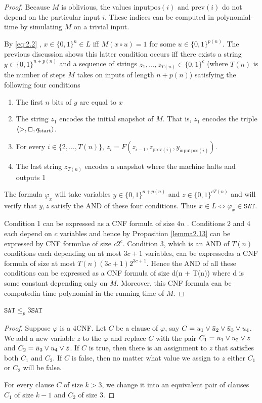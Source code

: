 \documentclass[11pt]{article}
\def \SAT {\text{SAT}}
\def \start {\text{start}}
\def \SAT {\texttt{SAT}}
\begin{document}
\begin{proof}
Because \(M\) is oblivious, the values \(\text{inputpos}(i)\) and \(\text{prev}(i)\) do not
depend on the particular input \(i\). These indices can be computed in polynomial-time by
simulating \(M\) on a trivial input.

By \eqref{eq:2.2} , \(x\in\{0,1\}^{n}\in L\) iff \(M(x\circ u)=1\) for
some \(u\in\{0,1\}^{p(n)}\). The previous discussion shows this latter condition occurs iff
there exists a string \(y\in\{0,1\}^{n+p(n)}\) and a sequence of strings
\(z_1,\dots,z_{T(n)}\in\{0,1\}^c\) (where \(T(n)\) is the number of steps \(M\) takes on inputs
of length \(n+p(n)\)) satisfying the following four conditions
\begin{enumerate}
\item The first \(n\) bits of \(y\) are equal to \(x\)
\item The string \(z_1\) encodes the initial snapshot of \(M\). That is, \(z_1\) encodes the
triple \(\la\rhd,\Box,q_{\start}\ra\).
\item For every \(i\in\{2,\dots,T(n)\}\), \(z_i=F(z_{i-1},z_{\text{prev}(i)},y_{\text{inputpos}(i)})\).
\item The last string \(z_{T(n)}\) encodes a snapshot where the machine halts and outputs 1
\end{enumerate}


The formula \(\varphi_x\) will take variables \(y\in\{0,1\}^{n+p(n)}\)
and \(z\in\{0,1\}^{cT(n)}\) and will verify that \(y,z\) satisfy the AND of these four
conditions. Thus \(x\in L\Leftrightarrow\varphi_x\in\SAT\).

Condition 1 can be expressed as a CNF formula of size \(4n\) . Conditions 2 and 4 each depend
on \(c\) variables and hence by Proposition \ref{lemma2.13} can be expressed by CNF formulae of
size \(c2^c\). Condition 3, which is an AND of \(T(n)\) conditions each  depending on at most \(3c+1\)
variables, can be expressedas a CNF formula of size at most \(T(n)(3c+1)2^{3c+1}\). Hence the AND of all
these conditions can be expressed as a CNF formula of size d(n + T(n)) where d is some constant
depending only on \(M\). Moreover, this CNF formula can be computedin time polynomial in the running
time of \(M\).
\end{proof}

\begin{lemma}[]
\(\SAT\le_p3\SAT\)
\end{lemma}

\begin{proof}
Suppose \(\varphi\) is a 4CNF. Let \(C\) be a clause of \(\varphi\), say \(C=u_1\vee\bar{u}_2\vee\bar{u}_3\vee u_4\).
We add a new variable \(z\) to the \(\varphi\) and replace \(C\) with the pair
\(C_1=u_1\vee\bar{u}_2\vee z\) and \(C_2=\bar{u}_3\vee u_4\vee\bar{z}\). If \(C\) is true, then there
is an assignment to \(z\) that satisfies both \(C_1\) and \(C_2\). If \(C\) is false, then no
matter what value we assign to \(z\) either \(C_1\) or \(C_2\) will be false.

For every clause \(C\) of size \(k>3\), we change it into an equivalent pair of clauses \(C_1\)
of size \(k-1\) and \(C_2\) of size 3.
\end{proof}
\end{document}
